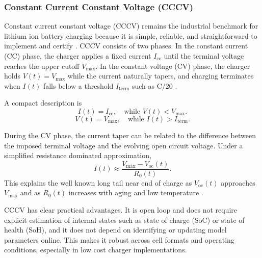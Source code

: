 \documentclass[%
 aip,
 amsmath,amssymb,
reprint, onecolumn %
]{revtex4-1}
\begin{document}
\subsubsection{\label{subsubsec:cccv}Constant Current Constant Voltage (CCCV)}

Constant current constant voltage (CCCV) remains the industrial benchmark for lithium ion battery charging because it is simple, reliable, and straightforward to implement and certify \cite{tomaszewska2019lithium,waldmann2014optimization}. CCCV consists of two phases. In the constant current (CC) phase, the charger applies a fixed current $I_{\mathrm{cc}}$ until the terminal voltage reaches the upper cutoff $V_{\max}$. In the constant voltage (CV) phase, the charger holds $V(t)=V_{\max}$ while the current naturally tapers, and charging terminates when $I(t)$ falls below a threshold $I_{\mathrm{term}}$ such as C/20 \cite{liu2018charging}.

A compact description is
\begin{equation}
I(t) = I_{\mathrm{cc}}, \quad \text{while } V(t) < V_{\max}.
\end{equation}
\begin{equation}
V(t) = V_{\max}, \quad \text{while } I(t) > I_{\mathrm{term}}.
\end{equation}

During the CV phase, the current taper can be related to the difference between the imposed terminal voltage and the evolving open circuit voltage. Under a simplified resistance dominated approximation,
\begin{equation}
I(t) \approx \frac{V_{\max} - V_{\mathrm{oc}}(t)}{R_0(t)} .
\end{equation}
This explains the well known long tail near end of charge as $V_{\mathrm{oc}}(t)$ approaches $V_{\max}$ and as $R_0(t)$ increases with aging and low temperature \cite{tomaszewska2019lithium,waldmann2014optimization}.

CCCV has clear practical advantages. It is open loop and does not require explicit estimation of internal states such as state of charge (SoC) or state of health (SoH), and it does not depend on identifying or updating model parameters online. This makes it robust across cell formats and operating conditions, especially in low cost charger implementations.
\end{document}

